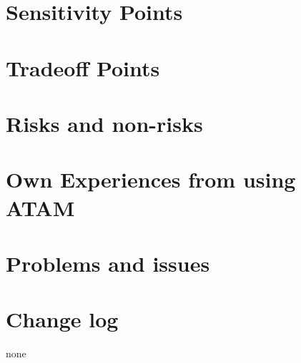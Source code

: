 \documentclass[12pt, a4paper]{article}
\begin{document}
\section{Sensitivity Points} 
\section{Tradeoff Points} 
\section{Risks and non-risks} 
\section{Own Experiences from using ATAM} 
\section{Problems and issues} 
\section{Change log} 
none
\end{document}
